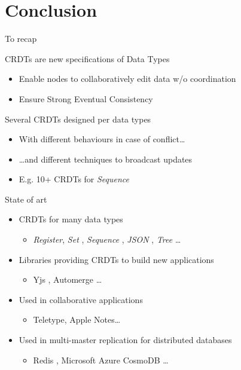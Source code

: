 \section{Conclusion}

\begin{frame}{To recap}
    \begin{block}{CRDTs are new specifications of Data Types}
        \begin{itemize}
            \item Enable nodes to collaboratively edit data w/o coordination
            \item Ensure Strong Eventual Consistency
        \end{itemize}
    \end{block}
    \begin{block}{Several CRDTs designed per data types}
        \begin{itemize}
            \item With different behaviours in case of conflict\dots
            \item \dots and different techniques to broadcast updates
            \item E.g. 10+ CRDTs for \emph{Sequence}
        \end{itemize}
    \end{block}
\end{frame}

\begin{frame}{State of art}
    \begin{itemize}
        \item CRDTs for many data types
        \begin{itemize}
            \item \emph{Register}, \emph{Set} \cite{2018-crdts-overview-preguica}, \emph{Sequence} \cite{ROH2011354,2009-logoot-weiss}, \emph{JSON} \cite{jsoncrdt2017}, \emph{Tree} \cite{2022-tree-crdt-kleppmann} \dots
        \end{itemize}
        \item Libraries providing CRDTs to build new applications
        \begin{itemize}
            \item Yjs \cite{yjsimplem}, Automerge \cite{automerge}\dots
        \end{itemize}
        \pause
        \item Used in collaborative applications
        \begin{itemize}
            \item Teletype, Apple Notes\dots
        \end{itemize}
        \item Used in multi-master replication for distributed databases
        \begin{itemize}
            \item Redis \cite{RedisEnterpriseActiveActiveGeoDistribution}, Microsoft Azure CosmoDB \cite{AzureCosmosDB}\dots
        \end{itemize}
    \end{itemize}
\end{frame}

